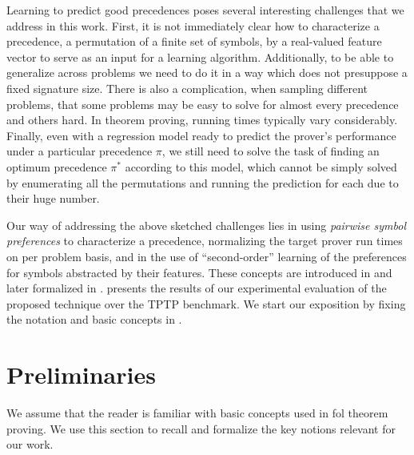 Learning to predict good precedences poses several interesting challenges that we address in this work.
First, it is not immediately clear how to characterize a precedence, a permutation of a finite set of symbols,
by a real-valued feature vector to serve as an input for a learning algorithm. 
Additionally, to be able to generalize across problems
we need to do it in a way which does not presuppose a fixed signature size. 
There is also a complication, when sampling different problems,
that some problems may be easy to solve for almost every precedence and others hard.
In theorem proving, running times typically vary considerably.
Finally, even with a regression model ready to predict the prover's performance 
under a particular precedence $\pi$, we still need to solve the task of finding 
an optimum precedence $\pi^*$ according to this model,
which cannot be simply solved by enumerating all the permutations and running the prediction for each
due to their huge number.

Our way of addressing the above sketched challenges lies in using \emph{pairwise symbol preferences}
to characterize a precedence, normalizing the target prover run times on per problem basis,
and in the use of ``second-order'' learning of the preferences for symbols abstracted by their features.
These concepts are introduced in  and later formalized in .
 presents the results of our experimental evaluation of the proposed technique over the TPTP \cite{Sut17} benchmark.
We start our exposition by fixing the notation and basic concepts in .


\section{Preliminaries} \label{sect:prelim}


We assume that the reader is familiar with basic concepts used in \gls*{fol} theorem proving.
We use this section to recall and formalize the key notions relevant for our work.

